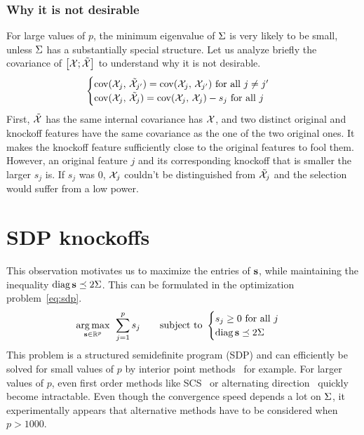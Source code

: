 \subsubsection{Why it is not desirable}

For large values of $p$,
the minimum eigenvalue of $\Sigma$ is very likely to be small,
unless $\Sigma$ has a substantially special structure.
Let us analyze briefly the covariance of $\big[ \mathcal{X}; \tilde{\mathcal{X}} \big]$ to understand why it is not desirable.
\begin{equation*}
    \begin{cases}
        \operatorname*{cov}(\mathcal{X}_j,\, \tilde{\mathcal{X}}_{j'}) = \operatorname*{cov}(\mathcal{X}_j,\, \mathcal{X}_{j'}) \text{ for all } j \neq j'\\
        \operatorname*{cov}(\mathcal{X}_j,\, \tilde{\mathcal{X}}_j) = \operatorname*{cov}(\mathcal{X}_j,\, \mathcal{X}_j) - s_j \text{ for all } j
    \end{cases}
\end{equation*}
First, $\tilde{\mathcal{X}}$ has the same internal covariance has $\mathcal{X}$,
and two distinct original and knockoff features have the same covariance as the one of the two original ones.
It makes the knockoff feature sufficiently close to the original features to fool them.
However, an original feature $j$ and its corresponding knockoff that is smaller the larger $s_j$ is.
If $s_j$ was $0$, $\mathcal{X}_j$ couldn't be distinguished from $\tilde{\mathcal{X}}_j$ and the selection would suffer from a low power.

\section{SDP knockoffs}\label{sec:sdp}

This observation motivates us to maximize the entries of $\mathbf{s}$,
while maintaining the inequality $\operatorname*{diag}\mathbf{s} \preceq 2\Sigma$.
This can be formulated in the optimization problem~\ref{eq:sdp}.
\begin{equation}\label{eq:sdp}
    \underset{\mathbf{s} \in \mathbb{R}^p}{\operatorname*{arg\,max}}\;\,
    \sum_{j = 1}^p s_j
    \qquad
    \text{subject to } \begin{cases}
        s_j \geq 0\text{ for all } j\\
        \operatorname*{diag} \mathbf{s} \preceq 2\Sigma
    \end{cases}
\end{equation}
This problem is a structured semidefinite program (SDP) and can efficiently be solved for small values of
$p$ by interior point methods~\cite{interior_point_method_sdp} for example.
For larger values of $p$, even first order methods like
SCS~\cite{sdp_scs} or alternating direction~\cite{sdp_admm}
quickly become intractable.
Even though the convergence speed depends a lot on $\Sigma$,
it experimentally appears that alternative methods have to be considered when $p > 1000$.

